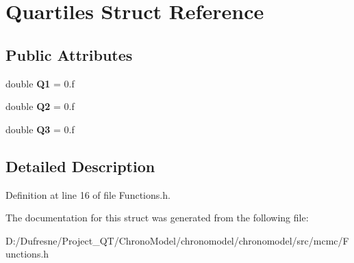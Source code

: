 \hypertarget{struct_quartiles}{\section{Quartiles Struct Reference}
\label{struct_quartiles}
}
\subsection*{Public Attributes}
\begin{DoxyCompactItemize}
\item 
\hypertarget{struct_quartiles_a68b88cb7e076d4601603bddfac3367da}{double {\bfseries Q1} = 0.f}\label{struct_quartiles_a68b88cb7e076d4601603bddfac3367da}

\item 
\hypertarget{struct_quartiles_a4a76326762f67e3a9145ccdde5cca0a8}{double {\bfseries Q2} = 0.f}\label{struct_quartiles_a4a76326762f67e3a9145ccdde5cca0a8}

\item 
\hypertarget{struct_quartiles_afbc57e8180d43ff363d5de8c739be9bb}{double {\bfseries Q3} = 0.f}\label{struct_quartiles_afbc57e8180d43ff363d5de8c739be9bb}

\end{DoxyCompactItemize}


\subsection{Detailed Description}


Definition at line 16 of file Functions.\-h.



The documentation for this struct was generated from the following file\-:\begin{DoxyCompactItemize}
\item 
D\-:/\-Dufresne/\-Project\-\_\-\-Q\-T/\-Chrono\-Model/chronomodel/chronomodel/src/mcmc/Functions.\-h\end{DoxyCompactItemize}
